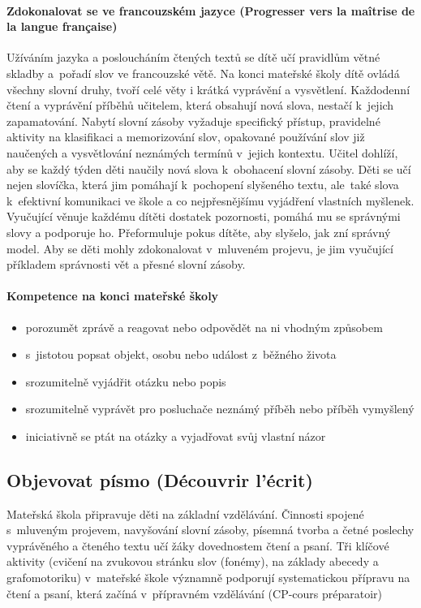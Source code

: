 			\paragraph{Zdokonalovat se ve francouzském jazyce (Progresser vers la maîtrise de la langue française)}
			Užíváním jazyka a posloucháním čtených textů se dítě učí pravidlům větné skladby a pořadí slov ve francouzské větě. Na konci mateřské školy dítě ovládá všechny slovní druhy, tvoří celé věty i krátká vyprávění a vysvětlení. Každodenní čtení a vyprávění příběhů učitelem, která obsahují nová slova, nestačí k jejich zapamatování. Nabytí slovní zásoby vyžaduje specifický přístup, pravidelné aktivity na klasifikaci a memorizování slov, opakované používání slov již naučených a vysvětlování neznámých termínů v jejich kontextu. Učitel dohlíží, aby se každý týden děti naučily nová slova k obohacení slovní zásoby. Děti se učí nejen slovíčka, která jim pomáhají k pochopení slyšeného textu, ale také slova k efektivní komunikaci ve škole a co nejpřesnějšímu vyjádření vlastních myšlenek. Vyučující věnuje každému dítěti dostatek pozornosti, pomáhá mu se správnými slovy a podporuje ho. Přeformuluje pokus dítěte, aby slyšelo, jak zní správný model. Aby se děti mohly zdokonalovat v mluveném projevu, je jim vyučující příkladem správnosti vět a přesné slovní zásoby.

			\paragraph{Kompetence na konci mateřské školy}
			\begin{itemize}
			\item porozumět zprávě a reagovat nebo odpovědět na ni vhodným způsobem
			\item s jistotou popsat objekt, osobu nebo událost z běžného života
			\item srozumitelně vyjádřit otázku nebo popis
			\item srozumitelně vyprávět pro posluchače neznámý příběh nebo příběh vymyšlený 
			\item iniciativně se ptát na otázky a vyjadřovat svůj vlastní názor
			\end{itemize}


		\subsection{Objevovat písmo (Découvrir l'écrit)}
			Mateřská škola připravuje děti na základní vzdělávání. Činnosti spojené s mluveným projevem, navyšování slovní zásoby, písemná tvorba a četné poslechy vyprávěného a čteného textu učí žáky dovednostem čtení a psaní. Tři klíčové aktivity (cvičení na zvukovou stránku slov (fonémy), na základy abecedy a grafomotoriku) v mateřské škole významně podporují systematickou přípravu na čtení a psaní, která začíná v přípravném vzdělávání (CP-cours préparatoir)

